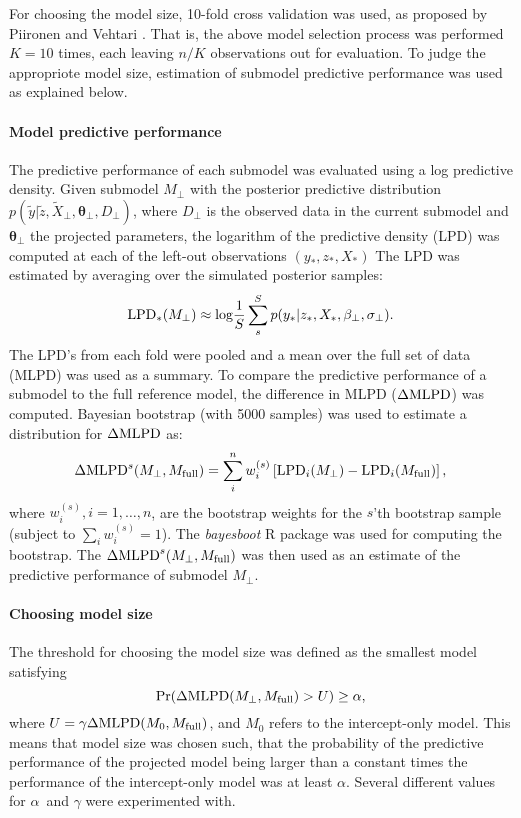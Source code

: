 For choosing the model size, 10-fold cross validation was used, as proposed by
Piironen and Vehtari \citep{Piironen2016}. That is, the above model selection
process was performed $K=10$ times, each leaving $n/K$ observations out for
evaluation. To judge the appropriote model size, estimation of submodel
predictive performance was used as explained below.

\paragraph{Model predictive performance}
The predictive performance of each submodel was evaluated using 
a log predictive density.
Given submodel $M_\perp$ with the posterior predictive distribution
$p(\tilde{y}| \tilde{z}, \tilde{X}_\perp, \mathbf{\theta}_\perp, D_\perp)$,
where $D_\perp$ is the observed data in the current submodel and
$\mathbf{\theta}_\perp$ the projected parameters, the logarithm of the predictive density
(LPD) was computed at each of the left-out observations $(y_*, z_*, X_*)$ The LPD was
estimated by averaging over the simulated posterior samples:
\[
	\textup{LPD}_*(M_\perp) \approx \textup{log}\frac{1}{S} \sum_s^S p(y_*| z_*, X_*, \mathbf{\beta}_\perp, \sigma_\perp).
\]
The LPD's from each fold were pooled and a mean over the full set of data
(MLPD) was used as a summary. To compare the predictive performance of a
submodel to the full reference model, the difference in MLPD ($\Delta \textup{MLPD}$) was
computed. Bayesian bootstrap (with 5000 samples) was used to estimate a
distribution for $\Delta \textup{MLPD}$ as:
\[
	\Delta \textup{MLPD}^{s}(M_\perp,M_{\textup{full}}) = \sum_i^n w_i^{(s)} \left [ \textup{LPD}_i(M_\perp) - \textup{LPD}_i(M_{\textup{full}}) \right ],
\]
where $w_i^{(s)}, i = 1, \dotsc,n$, are the bootstrap weights
for the $s$'th bootstrap sample (subject to $\sum_i w_i^{(s)} = 1$).
The \emph{bayesboot} R package was used for computing the bootstrap.
The $\Delta \textup{MLPD}^{s}(M_\perp,M_{\textup{full}})$ was then used
as an estimate of the predictive performance of submodel $M_\perp$.

\paragraph{Choosing model size}
The threshold for choosing the model size was defined as the smallest
model satisfying
\begin{equation}
	\label{eq:size-condition}
	\textup{Pr}(\Delta \textup{MLPD}(M_\perp,M_{\textup{full}}) > U) \geq \alpha,
\end{equation}
where $U = \gamma \Delta \textup{MLPD}(M_0,M_{\textup{full}})$, and
$M_0$ refers to the intercept-only model. This means that model
size was chosen such, that the probability of the predictive
performance of the projected model being larger than a constant times
the performance of the intercept-only model was at least $\alpha$.
Several different values for $\alpha$ and $\gamma$ were experimented with.

